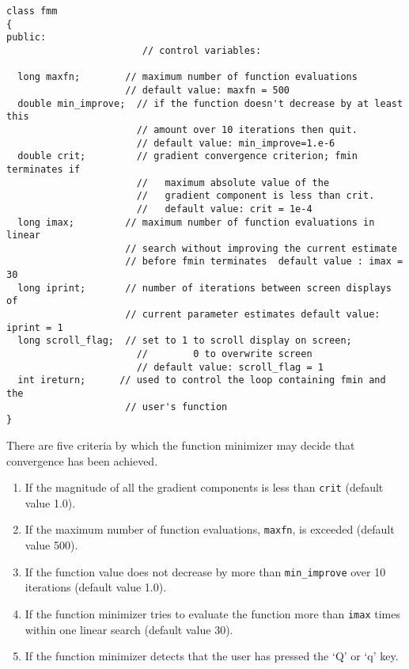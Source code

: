 \documentclass{admbmanual}
\begin{document}
\begin{lstlisting}
class fmm
{
public:
                        // control variables:

  long maxfn;        // maximum number of function evaluations
                     // default value: maxfn = 500
  double min_improve;  // if the function doesn't decrease by at least this
                       // amount over 10 iterations then quit.
                       // default value: min_improve=1.e-6
  double crit;         // gradient convergence criterion; fmin terminates if
                       //   maximum absolute value of the
                       //   gradient component is less than crit.
                       //   default value: crit = 1e-4
  long imax;         // maximum number of function evaluations in linear
                     // search without improving the current estimate
                     // before fmin terminates  default value : imax = 30
  long iprint;       // number of iterations between screen displays of
                     // current parameter estimates default value: iprint = 1
  long scroll_flag;  // set to 1 to scroll display on screen; 
                       //        0 to overwrite screen 
                       // default value: scroll_flag = 1
  int ireturn;      // used to control the loop containing fmin and the
                     // user's function 
} 
\end{lstlisting}

There are five criteria by which the function minimizer may decide that
convergence has been achieved.
\begin{enumerate}
\item If the magnitude of all the gradient components is less
than \texttt{crit} (default value 1.0).

\item If the maximum number of function evaluations, \texttt{maxfn}, is exceeded
(default value 500).

\item If the function value does not decrease by more than
\texttt{min\_improve} over 10 iterations (default value 1.0).

\item If the function minimizer tries to evaluate the function
more than \texttt{imax} times within one linear search (default value 30).

\item If the function minimizer detects that the user has pressed 
the `Q' or `q' key. 
\end{enumerate}
\end{document}

